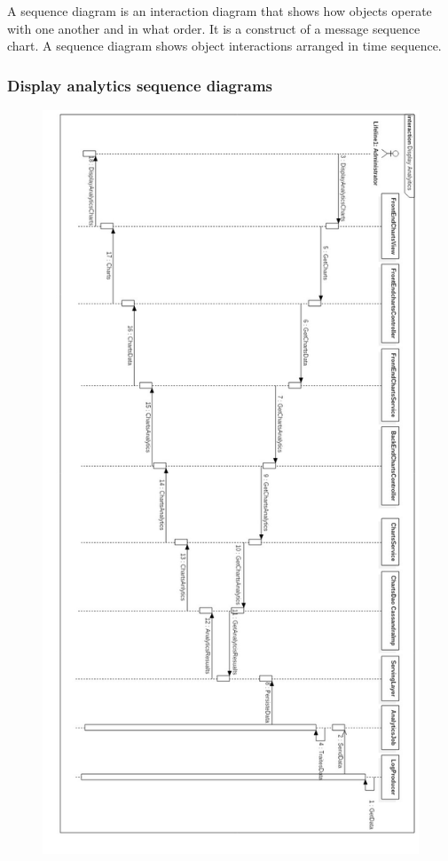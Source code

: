 A sequence diagram is an interaction diagram that shows how objects operate with one another 
and in what order. 
It is a construct of a message sequence chart. 
A sequence diagram shows object interactions arranged in time sequence.
\newpage
\subsubsection{Display analytics sequence diagrams}
\label{subsec:subsec01}
\begin{figure}[h!]
	\centering
	\includegraphics[height=0.85\textheight]{fig01/DisplayAnalyticsSequenceDiagram}
	\label{fig:FilialesEtClients}
\end{figure}
\newpage
